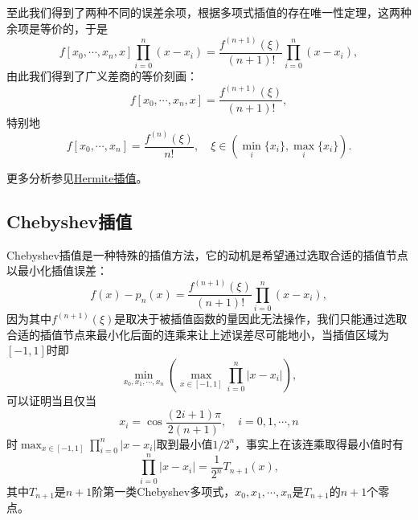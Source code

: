 \documentclass[a4paper,10pt]{ctexart}
\begin{document}
至此我们得到了两种不同的误差余项，根据多项式插值的存在唯一性定理，这两种余项是等价的，于是
\begin{equation}
    f[x_0,\cdots ,x_n,x] \prod_{i=0}^{n}(x-x_i) = \frac{f^{(n+1)}(\xi)}{(n+1)!}\prod_{i=0}^{n}(x-x_i),
\end{equation}
由此我们得到了广义差商的等价刻画：
\begin{equation}
    f[x_0,\cdots ,x_n,x] = \frac{f^{(n+1)}(\xi)}{(n+1)!},
\end{equation}
特别地
\begin{equation}
    f[x_0,\cdots ,x_n] = \frac{f^{(n)}(\xi)}{n!},\quad \xi\in (\min_i\{x_i\},\max_i\{x_i\}).
\end{equation}

更多分析参见\href{http://staff.ustc.edu.cn/~rui/ppt/num/num-interpolation-hermite.html}{Hermite插值}。

\subsection{Chebyshev插值}
Chebyshev插值是一种特殊的插值方法，它的动机是希望通过选取合适的插值节点以最小化插值误差：
\begin{equation}
    f(x)-p_n(x)=\frac{f^{(n+1)}(\xi)}{(n+1)!}\prod_{i=0}^{n}(x-x_i),
\end{equation}
因为其中$ f^{(n+1)}(\xi) $是取决于被插值函数的量因此无法操作，我们只能通过选取合适的插值节点来最小化后面的连乘来让上述误差尽可能地小，当插值区域为$ [-1,1] $时即
\begin{equation}
    \min_{x_0,x_1,\cdots ,x_n} \left( \max_{x\in [-1,1]} \prod_{i=0}^{n}|x-x_i| \right) ,
\end{equation}
可以证明当且仅当
\begin{equation}
    x_i = \cos \frac{(2i+1)\pi}{2(n+1)},\quad i=0,1,\cdots ,n
\end{equation}
时$ \max_{x\in [-1,1]} \prod_{i=0}^{n}|x-x_i| $取到最小值$ 1 / 2^{n} $，事实上在该连乘取得最小值时有
\begin{equation}
    \prod_{i=0}^{n}|x-x_i| = \frac{1}{2^{n}} T_{n+1}(x),
\end{equation}
其中$ T_{n+1} $是$ n+1 $阶第一类Chebyshev多项式，$ x_0,x_1,\cdots ,x_n $是$ T_{n+1} $的$ n+1 $个零点。
\end{document}
